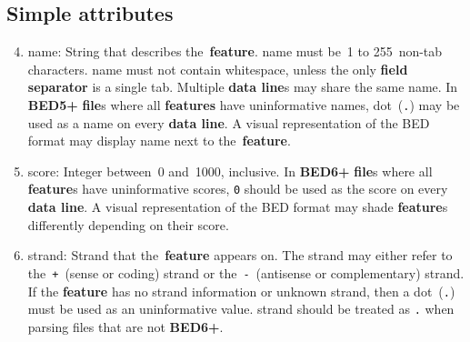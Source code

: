 \documentclass[11pt]{article}
\begin{document}
\subsection{Simple attributes}
\begin{enumerate}
  \setcounter{enumi}{3}

\item \textsf{name}: String that describes the~\textbf{feature}.
  \textsf{name} must be~1 to 255~non-tab characters.
  \textsf{name} must not contain whitespace, unless the only \textbf{field separator} is a single tab.
  Multiple \textbf{data line}s may share the same \textsf{name}.
  In \textbf{BED5+} \textbf{file}s where all \textbf{features} have uninformative \textsf{name}s, dot~(\texttt{.}) may be used as a \textsf{name} on every \textbf{data line}.
  A visual representation of the \ac{BED} format may display \textsf{name} next to the~\textbf{feature}.

\item \textsf{score}: Integer between~0 and~1000, inclusive.
  In \textbf{BED6+} \textbf{file}s where all \textbf{feature}s have uninformative \textsf{score}s, \texttt{0} should be used as the \textsf{score} on every \textbf{data line}.
  A visual representation of the \ac{BED} format may shade \textbf{feature}s differently depending on their \textsf{score}.

\item \textsf{strand}: Strand that the~\textbf{feature} appears on.
  The \textsf{strand} may either refer to the~\texttt{+}~(sense or coding) strand or the~\texttt{-}~(antisense or complementary) strand.
  If the \textbf{feature} has no \textsf{strand} information or unknown \textsf{strand}, then a dot~(\texttt{.}) must be used as an uninformative value.
  \textsf{strand} should be treated as \texttt{.} when parsing files that are not \textbf{BED6+}.
\end{enumerate}
\end{document}
